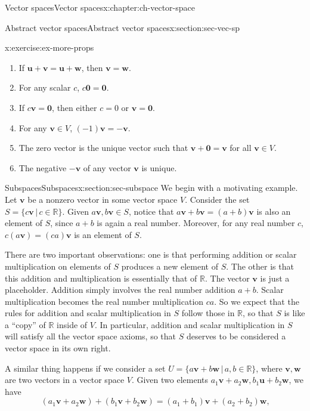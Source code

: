 \documentclass[oneside,10pt,]{book}
\numberwithin{equation}{section}
\newcommand{\R}{\mathbb{R}}
\newcommand{\uu}{\mathbf{u}}
\newcommand{\vv}{\mathbf{v}}
\newcommand{\ww}{\mathbf{w}}
\newcommand{\zer}{\mathbf{0}}
\begin{document}
\begin{chapterptx}{Vector spaces}{}{Vector spaces}{}{}{x:chapter:ch-vector-space}
\begin{sectionptx}{Abstract vector spaces}{}{Abstract vector spaces}{}{}{x:section:sec-vec-sp}
\begin{inlineexercise}{}{x:exercise:ex-more-props}
\begin{enumerate}
\item{}If \(\uu+\vv=\uu+\ww\), then \(\vv=\ww\).%
\item{}For any scalar \(c\), \(c\zer=\zer\).%
\item{}If \(c\vv=\zer\), then either \(c=0\) or \(\vv=\zer\).%
\item{}For any \(\vv\in V\), \((-1)\vv=-\vv\).%
\item{}The zero vector is the unique vector such that \(\vv+\zer=\vv\) for all \(\vv\in V\).%
\item{}The negative \(-\vv\) of any vector \(\vv\) is unique.%
\end{enumerate}
%
\end{inlineexercise}%
\end{sectionptx}
%
%
\typeout{************************************************}
\typeout{************************************************}
%
\begin{sectionptx}{Subspaces}{}{Subspaces}{}{}{x:section:sec-subspace}
We begin with a motivating example. Let \(\vv\) be a nonzero vector in some vector space \(V\). Consider the set \(S = \{c\vv\,|\, c\in \R\}\). Given \(a\vv,b\vv\in S\), notice that \(a\vv+b\vv=(a+b)\vv\) is also an element of \(S\), since \(a+b\) is again a real number. Moreover, for any real number \(c\), \(c(a\vv)=(ca)\vv\) is an element of \(S\).%
\par
There are two important observations: one is that performing addition or scalar multiplication on elements of \(S\) produces a new element of \(S\). The other is that this addition and multiplication is essentially that of \(\R\). The vector \(\vv\) is just a placeholder. Addition simply involves the real number addition \(a+b\). Scalar multiplication becomes the real number multiplication \(ca\). So we expect that the rules for addition and scalar multiplication in \(S\) follow those in \(\R\), so that \(S\) is like a ``copy'' of \(\R\) inside of \(V\). In particular, addition and scalar multiplication in \(S\) will satisfy all the vector space axioms, so that \(S\) deserves to be considered a vector space in its own right.%
\par
A similar thing happens if we consider a set \(U=\{a\vv+b\ww\,|\, a,b\in\R\}\), where \(\vv,\ww\) are two vectors in a vector space \(V\). Given two elements \(a_1\vv+a_2\ww,b_1\uu+b_2\ww\), we have%
\begin{equation*}
(a_1\vv+a_2\ww)+(b_1\vv+b_2\ww) = (a_1+b_1)\vv+(a_2+b_2)\ww\text{,}

\end{equation*}
\end{sectionptx}
\end{chapterptx}
\end{document}
